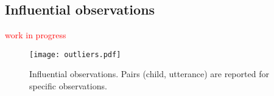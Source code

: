 \subsection{Influential observations} \label{sS:results_outliers}
%
\textcolor{red}{work in progress}
%
\begin{figure}[!h]
	\centering
	\texttt{[image: outliers.pdf]}
	\caption[Influential observations]{Influential observations. Pairs (child, utterance) are reported for specific observations.}
	\label{fig:outliers}
\end{figure}
%
%